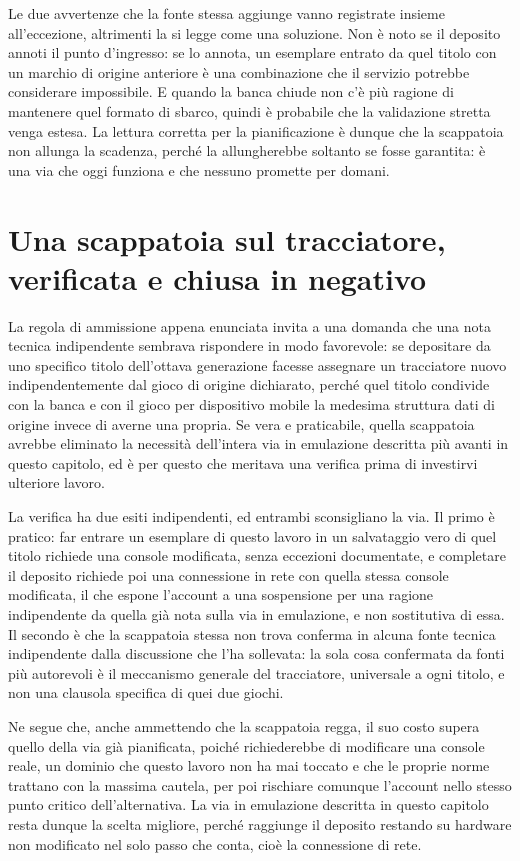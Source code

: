 Le due avvertenze che la fonte stessa aggiunge vanno registrate insieme all'eccezione, altrimenti la si legge come una soluzione. Non è noto se il deposito annoti il punto d'ingresso: se lo annota, un esemplare entrato da quel titolo con un marchio di origine anteriore è una combinazione che il servizio potrebbe considerare impossibile. E quando la banca chiude non c'è più ragione di mantenere quel formato di sbarco, quindi è probabile che la validazione stretta venga estesa. La lettura corretta per la pianificazione è dunque che la scappatoia non allunga la scadenza, perché la allungherebbe soltanto se fosse garantita: è una via che oggi funziona e che nessuno promette per domani.

\section{Una scappatoia sul tracciatore, verificata e chiusa in negativo}

La regola di ammissione appena enunciata invita a una domanda che una nota tecnica indipendente sembrava rispondere in modo favorevole: se depositare da uno specifico titolo dell'ottava generazione facesse assegnare un tracciatore nuovo indipendentemente dal gioco di origine dichiarato, perché quel titolo condivide con la banca e con il gioco per dispositivo mobile la medesima struttura dati di origine invece di averne una propria. Se vera e praticabile, quella scappatoia avrebbe eliminato la necessità dell'intera via in emulazione descritta più avanti in questo capitolo, ed è per questo che meritava una verifica prima di investirvi ulteriore lavoro.

La verifica ha due esiti indipendenti, ed entrambi sconsigliano la via. Il primo è pratico: far entrare un esemplare di questo lavoro in un salvataggio vero di quel titolo richiede una console modificata, senza eccezioni documentate, e completare il deposito richiede poi una connessione in rete con quella stessa console modificata, il che espone l'account a una sospensione per una ragione indipendente da quella già nota sulla via in emulazione, e non sostitutiva di essa. Il secondo è che la scappatoia stessa non trova conferma in alcuna fonte tecnica indipendente dalla discussione che l'ha sollevata: la sola cosa confermata da fonti più autorevoli è il meccanismo generale del tracciatore, universale a ogni titolo, e non una clausola specifica di quei due giochi.

Ne segue che, anche ammettendo che la scappatoia regga, il suo costo supera quello della via già pianificata, poiché richiederebbe di modificare una console reale, un dominio che questo lavoro non ha mai toccato e che le proprie norme trattano con la massima cautela, per poi rischiare comunque l'account nello stesso punto critico dell'alternativa. La via in emulazione descritta in questo capitolo resta dunque la scelta migliore, perché raggiunge il deposito restando su hardware non modificato nel solo passo che conta, cioè la connessione di rete.

